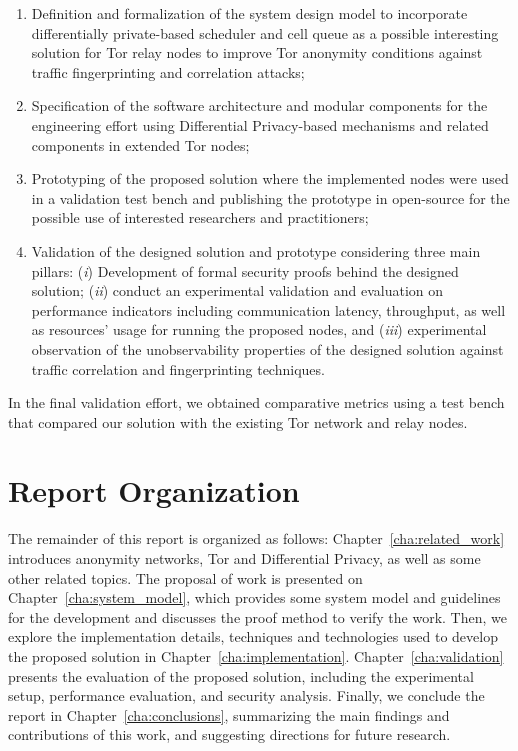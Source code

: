 \begin{enumerate}
    \item Definition and formalization of the system design model to incorporate differentially private-based scheduler and cell queue as a possible interesting solution for Tor relay nodes to improve Tor anonymity conditions against traffic fingerprinting and correlation attacks;

    \item Specification of the software architecture and modular components for the engineering effort using Differential Privacy-based mechanisms and related components in extended Tor nodes;
   
    \item Prototyping of the proposed solution where the implemented nodes were used in a validation test bench and publishing the prototype in open-source for the possible use of interested researchers and practitioners;
   
    \item Validation of the designed solution and prototype considering three main pillars: (\emph{i}) Development of formal security proofs behind the designed solution; (\emph{ii}) conduct an experimental validation and evaluation on performance indicators including communication latency, throughput, as well as resources' usage for running the proposed nodes, and (\emph{iii}) experimental observation of the unobservability properties of the designed solution against traffic correlation and fingerprinting techniques. 
   
\end{enumerate}

In the final validation effort, we obtained comparative metrics using a test bench that compared our solution with the existing Tor network and relay nodes.


\section{Report Organization}\label{sec:report_organization}
The remainder of this report is organized as follows: Chapter~\ref{cha:related_work} introduces anonymity networks, Tor and Differential Privacy, as well as some other related topics. The proposal of work is presented on Chapter~\ref{cha:system_model}, which provides some system model and guidelines for the development and discusses the proof method to verify the work. Then, we explore the implementation details, techniques and technologies used to develop the proposed solution in Chapter~\ref{cha:implementation}. Chapter~\ref{cha:validation} presents the evaluation of the proposed solution, including the experimental setup, performance evaluation, and security analysis. Finally, we conclude the report in Chapter~\ref{cha:conclusions}, summarizing the main findings and contributions of this work, and suggesting directions for future research.